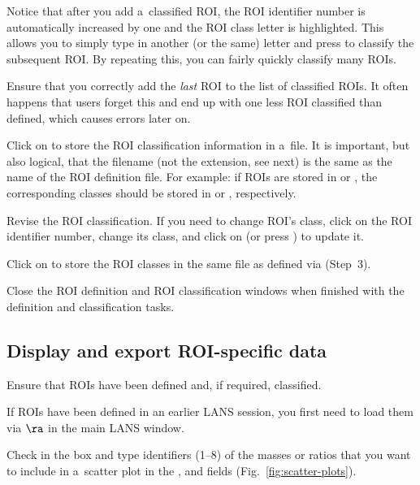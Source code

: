 \nb
\bul Notice that after you add a~classified ROI, the ROI identifier number is automatically increased by one and the ROI class letter is highlighted. This allows you to simply type in another (or the same) letter and press  to classify the subsequent ROI. By repeating this, you can fairly quickly classify many ROIs.

\bul Ensure that you correctly add the \emph{last} ROI to the list of classified ROIs. It often happens that users forget this and end up with one less ROI classified than defined, which causes errors later on.

\s Click on  to store the ROI classification information in a~file. It is important, but also logical, that the filename (not the extension, see next) is the same as the name of the ROI definition file. For example: if ROIs are stored in  or , the corresponding classes should be stored in  or , respectively.

\s Revise the ROI classification. If you need to change ROI's class, click on the ROI identifier number, change its class, and click on  (or press ) to update it.

\s Click on  to store the ROI classes in the same file as defined via  (Step~3).

\s Close the ROI definition and ROI classification windows when finished with the definition and classification tasks.


\subsection{Display and export ROI-specific data}
\setcounter{step}{0}

\s Ensure that ROIs have been defined and, if required, classified.

\nb
\bul If ROIs have been defined in an earlier LANS session, you first need to load them via  $\ra$  in the main LANS window.

\s Check  in the  box and type identifiers (1--8) of the masses or ratios that you want to include in a~scatter plot in the ,  and  fields (Fig.~\ref{fig:scatter-plots}).

